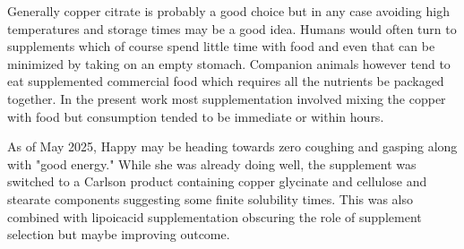 Generally copper citrate is probably a good choice but in any
case avoiding high temperatures and storage times may be a good
idea. Humans would often turn to supplements which of course
spend little time with food and even that can be minimized
by taking on an empty stomach. Companion animals however
tend to eat supplemented commercial food which requires all the
nutrients be packaged together. In the present work most supplementation 
involved mixing the copper with food but consumption tended to 
be immediate or within hours.  


As of May 2025, Happy may be heading towards zero coughing and gasping
along with "good energy." While she was already doing well, the supplement 
was switched to a Carlson product containing copper glycinate and cellulose
and stearate components suggesting some finite solubility times. 
This was also combined with lipoicacid supplementation obscuring the
role of supplement selection but maybe improving outcome.



